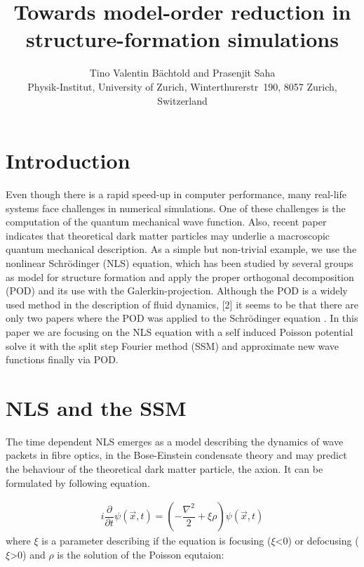 \documentclass[usenatbib]{mn2e}
\title{Towards model-order reduction in structure-formation simulations}
\author[B\"achtold and Saha]{Tino Valentin B\"achtold and Prasenjit Saha \\
Physik-Institut, University of Zurich, Winterthurerstr~190, 8057 Zurich, Switzerland \\ }
\date{}
\begin{document}
\maketitle

\begin{abstract}
\end{abstract}

\begin{keywords}

\end{keywords}

\section{Introduction}
Even though there is a rapid speed-up in computer performance, many real-life systems face challenges in numerical simulations. One of these challenges is the computation of the quantum mechanical wave function. Also, recent paper indicates that theoretical dark matter particles may underlie a macroscopic quantum mechanical description. 
As a simple but non-trivial example, we use the nonlinear
Schr\"odinger (NLS) equation, which has been studied by several groups as
model for structure formation\citep{1993ApJ...416L..71W,2014PhRvD..90b3517U} and apply the proper orthogonal decomposition (POD) and its use with the Galerkin-projection. 
Although the POD is a widely used method in the description of fluid dynamics, [2] it seems to be that there are only two papers where the POD was applied to the Schr\"odinger equation \citep{Karasoezen2015509}. In this paper we are focusing on the NLS equation with a self induced Poisson potential solve it with the split step Fourier method (SSM) and approximate new wave functions finally via POD. 
\section{NLS and the SSM}
The time dependent NLS emerges as a model describing the dynamics of wave packets in fibre optics, in the Bose-Einstein condensate theory and may predict the behaviour of the theoretical dark matter particle, the axion. It can be formulated by following equation.


\begin{equation} \label{eq1}
\begin{split}
i\dfrac {\partial } {\partial t}\psi( \overrightarrow{x},t) =( -\dfrac {\nabla ^{2}} {2}+ \xi \rho) \psi( \overrightarrow {x},t)
\end{split}
\end{equation}
where \(\xi\) is a parameter describing if the equation is focusing (\(\xi\)\textless  0) or defocusing (\(\xi\)\textgreater0) and \(\rho\) is the solution of the Poisson equtaion:
\end{document}
